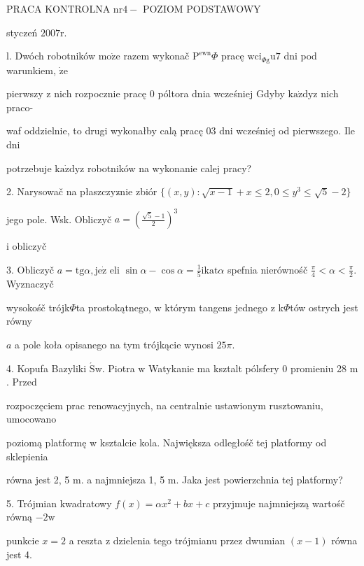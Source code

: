 \documentclass[a4paper,12pt]{article}
\begin{document}
PRACA KONTROLNA $\mathrm{n}\mathrm{r}4-$ POZIOM PODSTAWOWY

styczeń $2007\mathrm{r}.$

l. Dwóch robotników $\mathrm{m}\mathrm{o}\dot{\mathrm{z}}\mathrm{e}$ razem wykonač $\mathrm{P}^{\mathrm{e}\mathrm{w}\mathrm{n}}\Phi$ pracę $\mathrm{w}\mathrm{c}\mathrm{i}_{\Phi \mathrm{g}}\mathrm{u}7$ dni pod warunkiem, $\dot{\mathrm{z}}\mathrm{e}$

pierwszy $\mathrm{z}$ nich rozpocznie pracę $0$ póltora dnia wcześniej Gdyby $\mathrm{k}\mathrm{a}\dot{\mathrm{z}}\mathrm{d}\mathrm{y}\mathrm{z}$ nich praco-

waf oddzielnie, to drugi wykonałby calą pracę $03$ dni wcześniej od pierwszego. Ile dni

potrzebuje $\mathrm{k}\mathrm{a}\dot{\mathrm{z}}\mathrm{d}\mathrm{y}\mathrm{z}$ robotników na wykonanie calej pracy?

2. Narysowač na płaszczyz$\acute{}$nie zbiór $\{(x,y):\sqrt{x-1}+x\leq 2,0\leq y^{3}\leq\sqrt{5}-2\}$

jego pole. Wsk. Obliczyč $a=(\displaystyle \frac{\sqrt{5}-1}{2})^{3}$

i obliczyč

3. Obliczyč $a=\mathrm{t}\mathrm{g}\alpha, \mathrm{j}\mathrm{e}\dot{\mathrm{z}}$ eli $\displaystyle \sin\alpha-\cos\alpha=\frac{1}{5}\mathrm{i}\mathrm{k}\mathrm{a}\mathrm{t}\alpha$ spefnia nierównośč $\displaystyle \frac{\pi}{4}<\alpha<\frac{\pi}{2}$. Wyznaczyč

wysokośč trójk$\Phi$ta prostokątnego, $\mathrm{w}$ którym tangens jednego $\mathrm{z}$ k$\Phi$tów ostrych jest równy

$a$ a pole koła opisanego na tym trójkącie wynosi $25\pi.$

4. Kopufa Bazyliki $\acute{\mathrm{S}}\mathrm{w}$. Piotra $\mathrm{w}$ Watykanie ma ksztalt pólsfery $0$ promieniu 28 $\mathrm{m}$. Przed

rozpoczęciem prac renowacyjnych, na centralnie ustawionym rusztowaniu, umocowano

poziomą platformę $\mathrm{w}$ ksztalcie kola. Największa odległośč tej platformy od sklepienia

równa jest 2, 5 $\mathrm{m}$. a najmniejsza 1, 5 $\mathrm{m}$. Jaka jest powierzchnia tej platformy?

5. Trójmian kwadratowy $f(x)=\alpha x^{2}+bx+c$ przyjmuje najmniejszą wartośč równą $-2\mathrm{w}$

punkcie $x=2$ a reszta $\mathrm{z}$ dzielenia tego trójmianu przez dwumian $(x-1)$ równa jest 4.
\end{document}
